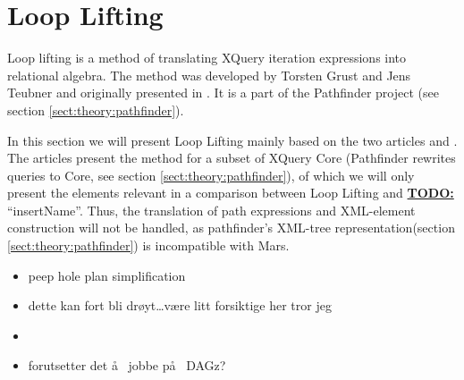 \section{Loop Lifting}
\label{sect:translation:loop_lifting}
Loop lifting is a method of translating XQuery iteration expressions into relational algebra. The method was
developed by Torsten Grust and Jens Teubner and originally presented in \cite{pathfinder_mothertongue}. It is a
part of the Pathfinder project\cite{pathfinderHome} (see section \ref{sect:theory:pathfinder}).

In this section we will present Loop Lifting mainly based on the two articles \cite{pathfinder_mothertongue} and
\cite{pathfinder_purelyRelational}. The articles present the method for a subset of XQuery Core (Pathfinder
rewrites queries to Core, see section \ref{sect:theory:pathfinder}), of which we will only present the elements
relevant in a comparison between Loop Lifting and \underline{\textbf{\Large TODO:}} ``insertName''. Thus, the
translation of path expressions and XML-element construction will not be handled, as pathfinder's XML-tree
representation(section \ref{sect:theory:pathfinder}) is incompatible with Mars.

\begin{itemize}
  \item peep hole plan simplification
  \item dette kan fort bli dr\o yt\ldots v\ae re litt forsiktige her tror jeg
  \item   \item forutsetter det \aa~ jobbe p\aa~ DAGz?
\end{itemize}

